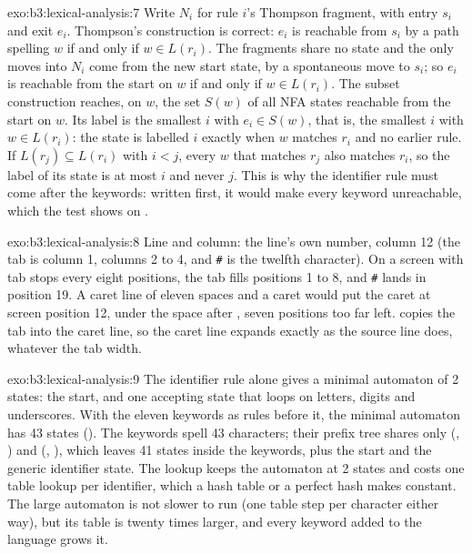 \begin{solution}{exo:b3:lexical-analysis:7}
Write $N_i$ for rule $i$'s Thompson fragment, with entry $s_i$ and exit $e_i$. Thompson's construction is correct: $e_i$ is reachable from $s_i$ by a path spelling $w$ if and only if $w \in L(r_i)$. The fragments share no state and the only moves into $N_i$ come from the new start state, by a spontaneous move to $s_i$; so $e_i$ is reachable from the start on $w$ if and only if $w \in L(r_i)$. The subset construction reaches, on $w$, the set $S(w)$ of all NFA states reachable from the start on $w$. Its label is the smallest $i$ with $e_i \in S(w)$, that is, the smallest $i$ with $w \in L(r_i)$: the state is labelled $i$ exactly when $w$ matches $r_i$ and no earlier rule. If $L(r_j) \subseteq L(r_i)$ with $i < j$, every $w$ that matches $r_j$ also matches $r_i$, so the label of its state is at most $i$ and never $j$. This is why the identifier rule must come after the keywords: written first, it would make every keyword unreachable, which the test  shows on .
\end{solution}

\begin{solution}{exo:b3:lexical-analysis:8}
Line and column: the line's own number, column 12 (the tab is column 1,  columns 2 to 4, and \texttt{\#} is the twelfth character). On a screen with tab stops every eight positions, the tab fills positions 1 to 8, and \texttt{\#} lands in position 19. A caret line of eleven spaces and a caret would put the caret at screen position 12, under the space after , seven positions too far left.  copies the tab into the caret line, so the caret line expands exactly as the source line does, whatever the tab width.
\end{solution}

\begin{solution}{exo:b3:lexical-analysis:9}
The identifier rule alone gives a minimal automaton of 2 states: the start, and one accepting state that loops on letters, digits and underscores. With the eleven keywords as rules before it, the minimal automaton has 43 states (). The keywords spell 43 characters; their prefix tree shares only  (, ) and  (, ), which leaves 41 states inside the keywords, plus the start and the generic identifier state. The lookup keeps the automaton at 2 states and costs one table lookup per identifier, which a hash table or a perfect hash makes constant. The large automaton is not slower to run (one table step per character either way), but its table is twenty times larger, and every keyword added to the language grows it.
\end{solution}

